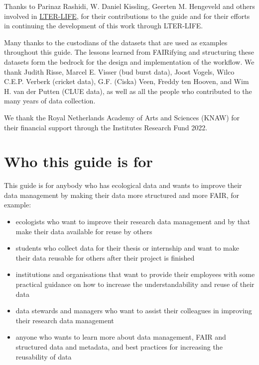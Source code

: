 \documentclass[
]{book}
\begin{document}
Thanks to Parinaz Rashidi, W. Daniel Kissling, Geerten M. Hengeveld and others involved in \href{https://lter-life.nl/en}{LTER-LIFE}, for their contributions to the guide and for their efforts in continuing the development of this work through LTER-LIFE.

Many thanks to the custodians of the datasets that are used as examples throughout this guide. The lessons learned from FAIRifying and structuring these datasets form the bedrock for the design and implementation of the workflow. We thank Judith Risse, Marcel E. Visser (bud burst data), Joost Vogels, Wilco C.E.P. Verberk (cricket data), G.F. (Ciska) Veen, Freddy ten Hooven, and Wim H. van der Putten (CLUE data), as well as all the people who contributed to the many years of data collection.

We thank the Royal Netherlands Academy of Arts and Sciences (KNAW) for their financial support through the Institutes Research Fund 2022.

\hypertarget{who-this-guide-is-for}{%
\section*{Who this guide is for}\label{who-this-guide-is-for}}

This guide is for anybody who has ecological data and wants to improve their data management by making their data more structured and more FAIR, for example:

\begin{itemize}
\item
  ecologists who want to improve their research data management and by that make their data available for reuse by others
\item
  students who collect data for their thesis or internship and want to make their data reusable for others after their project is finished
\item
  institutions and organisations that want to provide their employees with some practical guidance on how to increase the understandability and reuse of their data
\item
  data stewards and managers who want to assist their colleagues in improving their research data management
\item
  anyone who wants to learn more about data management, FAIR and structured data and metadata, and best practices for increasing the reusability of data
\end{itemize}
\end{document}
